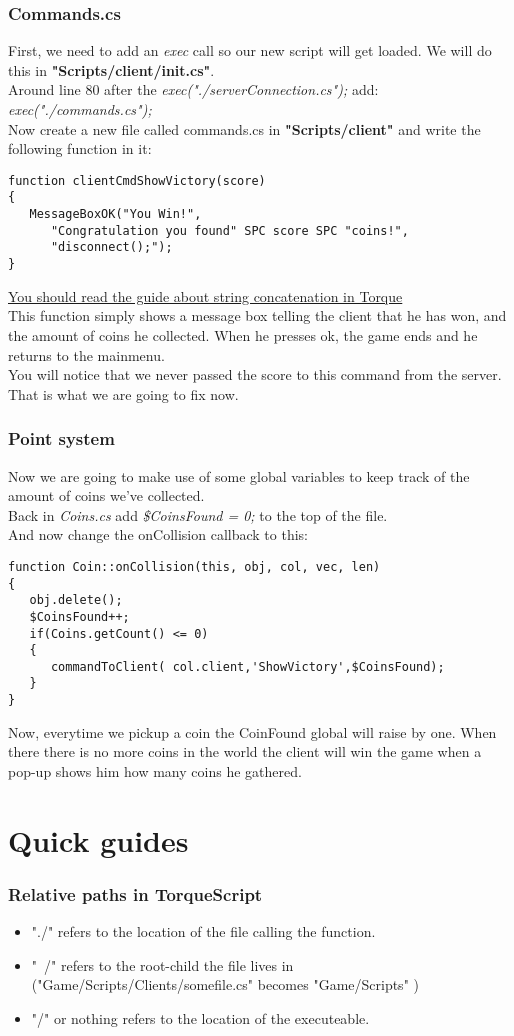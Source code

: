 \begin{frame}[fragile]
\frametitle{Commands.cs}
First, we need to add an {\it exec} call so our new script will get loaded. We will do this in
{\bf "Scripts/client/init.cs"}.\\
Around line 80 after the {\it exec("./serverConnection.cs");} add: {\it exec("./commands.cs");}\\
Now create a new file called commands.cs in {\bf "Scripts/client"} and write the following function in it:
\TS
\begin{lstlisting}
function clientCmdShowVictory(score)
{
   MessageBoxOK("You Win!",
      "Congratulation you found" SPC score SPC "coins!",
      "disconnect();");
}
\end{lstlisting}
{\color{blue}\hyperlink{QG-Concatenation}{You should read the guide about string concatenation in Torque}}\\
This function simply shows a message box telling the client that he has won, and the amount of coins he collected.
When he presses ok, the game ends and he returns to the mainmenu.\\
You will notice that we never passed the score to this command from the server. That is what we are going to fix now.
\end{frame}

\begin{frame}[fragile]
\frametitle{Point system}
Now we are going to make use of some global variables to keep track of the amount of coins we've collected.\\
Back in {\it Coins.cs} add {\it \$CoinsFound = 0;} to the top of the file.\\
And now change the onCollision callback to this:
\TS
\begin{lstlisting}
function Coin::onCollision(this, obj, col, vec, len)
{
   obj.delete();
   $CoinsFound++;
   if(Coins.getCount() <= 0)
   {
      commandToClient( col.client,'ShowVictory',$CoinsFound);
   }
}
\end{lstlisting}
Now, everytime we pickup a coin the CoinFound global will raise by one. When there there is no more coins in the world
the client will win the game when a pop-up shows him how many coins he gathered.
\end{frame}

\section{Quick guides}
\begin{frame}
\hypertarget{QG-Paths}{}
\frametitle{Relative paths in TorqueScript}
\begin{itemize}
\item "./" refers to the location of the file calling the function.
\item "~/" refers to the root-child the file lives in ("Game/Scripts/Clients/somefile.cs" becomes "Game/Scripts" )
\item "/" or nothing refers to the location of the executeable.
\end{itemize}
\end{frame}

